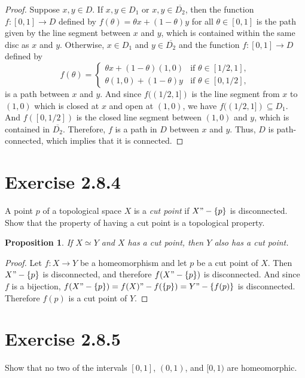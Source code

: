 \documentclass[12pt]{article}
\newtheorem{proposition}{Proposition}
\newenvironment{problem}
    {\begin{lrbox}{\mybox}\begin{minipage}{\textwidth-10pt}}
    {\end{minipage}\end{lrbox}\framebox[6.5in]{\usebox{\mybox}}}
\newcommand{\clo}[1]{\overline{#1}}
\begin{document}
\begin{proof}
    Suppose $x,y\in D$. If $x,y\in D_1$ or $x,y\in \clo{D_2}$, then the function $f:[0,1]\to D$ defined by $f(\theta) = \theta x + (1-\theta)y$ for all $\theta\in[0,1]$ is the path given by the line segment between $x$ and $y$, which is contained within the same disc as $x$ and $y$. Otherwise, $x\in D_1$ and $y\in\clo{D_2}$ and the function $f:[0,1]\to D$ defined by
    \[f(\theta) = \begin{cases}
        \theta x + (1-\theta)(1,0) &\text{if } \theta\in[1/2,1], \\
        \theta (1,0) + (1-\theta)y &\text{if } \theta\in[0,1/2],
    \end{cases}\]
    is a path between $x$ and $y$. And since $f((1/2,1])$ is the line segment from $x$ to $(1,0)$ which is closed at $x$ and open at $(1,0)$, we have $f((1/2,1])\subseteq D_1$. And $f([0,1/2])$ is the closed line segment between $(1,0)$ and $y$, which is contained in $\clo{D_2}$. Therefore, $f$ is a path in $D$ between $x$ and $y$. Thus, $D$ is path-connected, which implies that it is connected.
    
\end{proof}

\section*{Exercise 2.8.4}
\begin{problem}
    A point $p$ of a topological space $X$ is a \emph{cut point} if $X"-\{p\}$ is disconnected. Show that the property of having a cut point is a topological property.
\end{problem}

\begin{proposition}
    If $X\simeq Y$ and $X$ has a cut point, then $Y$ also has a cut point.
\end{proposition}

\begin{proof}
    Let $f:X\to Y$ be a homeomorphism and let $p$ be a cut point of $X$. Then $X"-\{p\}$ is disconnected, and therefore $f(X"-\{p\})$ is disconnected. And since $f$ is a bijection, $f(X"-\{p\}) = f(X)"-f(\{p\}) = Y"-\{f(p)\}$ is disconnected. Therefore $f(p)$ is a cut point of $Y$.
    
\end{proof}

\section*{Exercise 2.8.5}
\begin{problem}
    Show that no two of the intervals $[0,1]$, $(0,1)$, and $[0,1)$ are homeomorphic. 
\end{problem}
\end{document}
